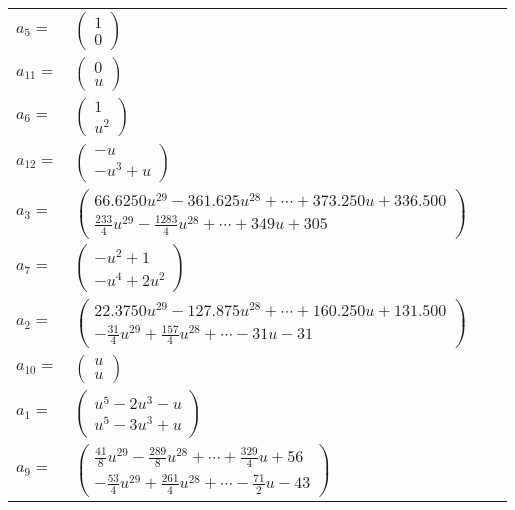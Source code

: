 \documentclass[1p]{elsarticle_modified}
\theoremstyle{definition}
\begin{document}
\begin{tabular}{m{7pt} m{180pt} m{7pt} m{180pt} }
\flushright $a_{5}=$&$\begin{pmatrix}1\\0\end{pmatrix}$ \\
\flushright $a_{11}=$&$\begin{pmatrix}0\\u\end{pmatrix}$ \\
\flushright $a_{6}=$&$\begin{pmatrix}1\\u^2\end{pmatrix}$ \\
\flushright $a_{12}=$&$\begin{pmatrix}- u\\- u^3+u\end{pmatrix}$ \\
\flushright $a_{3}=$&$\begin{pmatrix}66.6250 u^{29}-361.625 u^{28}+\cdots+373.250 u+336.500\\\frac{233}{4} u^{29}-\frac{1283}{4} u^{28}+\cdots+349 u+305\end{pmatrix}$ \\
\flushright $a_{7}=$&$\begin{pmatrix}- u^2+1\\- u^4+2 u^2\end{pmatrix}$ \\
\flushright $a_{2}=$&$\begin{pmatrix}22.3750 u^{29}-127.875 u^{28}+\cdots+160.250 u+131.500\\-\frac{31}{4} u^{29}+\frac{157}{4} u^{28}+\cdots-31 u-31\end{pmatrix}$ \\
\flushright $a_{10}=$&$\begin{pmatrix}u\\u\end{pmatrix}$ \\
\flushright $a_{1}=$&$\begin{pmatrix}u^5-2 u^3- u\\u^5-3 u^3+u\end{pmatrix}$ \\
\flushright $a_{9}=$&$\begin{pmatrix}\frac{41}{8} u^{29}-\frac{289}{8} u^{28}+\cdots+\frac{329}{4} u+56\\-\frac{53}{4} u^{29}+\frac{261}{4} u^{28}+\cdots-\frac{71}{2} u-43\end{pmatrix}$ \\

\end{tabular}
\end{document}
